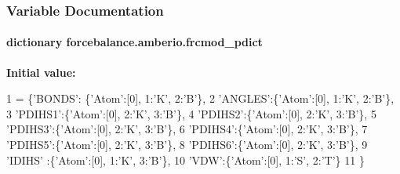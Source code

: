 \subsubsection{Variable Documentation}
\hypertarget{namespaceforcebalance_1_1amberio_a7d8a1776c628e73cc2f4fb6eba17030a}{
\paragraph[{frcmod\-\_\-pdict}]{\setlength{\rightskip}{0pt plus 5cm}dictionary forcebalance.\-amberio.\-frcmod\-\_\-pdict}}\label{namespaceforcebalance_1_1amberio_a7d8a1776c628e73cc2f4fb6eba17030a}
{\bfseries Initial value\-:}
\begin{DoxyCode}
1 = \{\textcolor{stringliteral}{'BONDS'}: \{\textcolor{stringliteral}{'Atom'}:[0], 1:\textcolor{stringliteral}{'K'}, 2:\textcolor{stringliteral}{'B'}\},
2                 \textcolor{stringliteral}{'ANGLES'}:\{\textcolor{stringliteral}{'Atom'}:[0], 1:\textcolor{stringliteral}{'K'}, 2:\textcolor{stringliteral}{'B'}\},
3                 \textcolor{stringliteral}{'PDIHS1'}:\{\textcolor{stringliteral}{'Atom'}:[0], 2:\textcolor{stringliteral}{'K'}, 3:\textcolor{stringliteral}{'B'}\},
4                 \textcolor{stringliteral}{'PDIHS2'}:\{\textcolor{stringliteral}{'Atom'}:[0], 2:\textcolor{stringliteral}{'K'}, 3:\textcolor{stringliteral}{'B'}\},
5                 \textcolor{stringliteral}{'PDIHS3'}:\{\textcolor{stringliteral}{'Atom'}:[0], 2:\textcolor{stringliteral}{'K'}, 3:\textcolor{stringliteral}{'B'}\},
6                 \textcolor{stringliteral}{'PDIHS4'}:\{\textcolor{stringliteral}{'Atom'}:[0], 2:\textcolor{stringliteral}{'K'}, 3:\textcolor{stringliteral}{'B'}\},
7                 \textcolor{stringliteral}{'PDIHS5'}:\{\textcolor{stringliteral}{'Atom'}:[0], 2:\textcolor{stringliteral}{'K'}, 3:\textcolor{stringliteral}{'B'}\},
8                 \textcolor{stringliteral}{'PDIHS6'}:\{\textcolor{stringliteral}{'Atom'}:[0], 2:\textcolor{stringliteral}{'K'}, 3:\textcolor{stringliteral}{'B'}\},
9                 \textcolor{stringliteral}{'IDIHS'} :\{\textcolor{stringliteral}{'Atom'}:[0], 1:\textcolor{stringliteral}{'K'}, 3:\textcolor{stringliteral}{'B'}\},
10                 \textcolor{stringliteral}{'VDW'}:\{\textcolor{stringliteral}{'Atom'}:[0], 1:\textcolor{stringliteral}{'S'}, 2:\textcolor{stringliteral}{'T'}\}
11                 \}
\end{DoxyCode}


